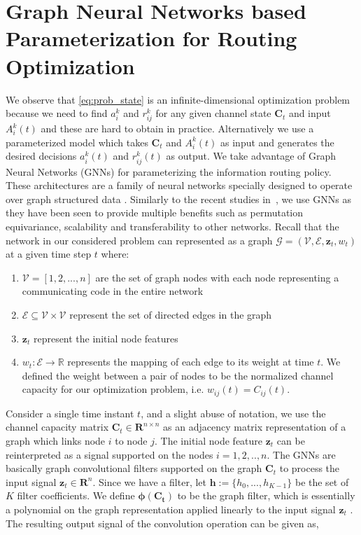 \documentclass[lettersize,journal]{IEEEtran}
\begin{document}
\section{Graph Neural Networks based Parameterization for Routing Optimization} \label{sec:gnn_par}
We observe that \eqref{eq:prob_state} is an infinite-dimensional optimization problem because we need to find $a_i^k$ and $r_{ij}^k$ for any given channel state $\mathbf{C}_t$ and input $A_i^k(t)$ and these are hard to obtain in practice. Alternatively we use a parameterized model which takes $\mathbf{C}_t$ and $A_i^k(t)$ as input and generates the desired decisions $a_i^k(t)$ and $r_{ij}^k(t)$ as output. We take advantage of Graph Neural Networks (GNNs) for parameterizing the information routing policy. These architectures are a family of neural networks specially designed to operate over graph structured data \cite{battaglia2018relational, wu2020comprehensive}. Similarly to the recent studies in~\cite{eisen2020optimal, naderializadeh2023learning, naderializadeh2022state, lee2020graph, shen2019graph}, we use GNNs as they have been seen to provide multiple benefits such as permutation equivariance, scalability and transferability to other networks. Recall that the network in our considered problem can represented as a graph $\mathcal{G} = (\mathcal{V}, \mathcal{E}, \mathbf{z}_t, w_t)$ at a given time step $t$ where: 
\begin{enumerate}
    \item $\mathcal{V}=[1,2,...,n]$ are the set of graph nodes with each node representing a communicating code in the entire network
    \item $\mathcal{E} \subseteq \mathcal{V} \times \mathcal{V}$ represent the set of directed edges in the graph
    \item $\mathbf{z}_t$ represent the initial node features%
    \item $w_t: \mathcal{E} \rightarrow \mathbb{R}$ represents the mapping of each edge to its weight at time $t$. We defined the weight between a pair of nodes to be the normalized channel capacity for our optimization problem, i.e. $w_{ij}(t) = C_{ij}(t)$.
\end{enumerate}
Consider a single time instant $t$, and a slight abuse of notation, we use the channel capacity matrix $\mathbf{C}_t \in \mathbf{R}^{n \times n}$ as an adjacency matrix representation of a graph which links node $i$ to node $j$. The initial node feature $\mathbf{z}_t$ can be reinterpreted as a signal supported on the nodes $i=1,2,..,n$. The GNNs are basically graph convolutional filters supported on the graph $\mathbf{C}_t$ to process the input signal $\mathbf{z}_t \in \mathbf{R}^n$. Since we have a filter, let $\mathbf{h} := \{h_0,...,h_{K-1}\}$ be the set of $K$ filter coefficients. We define $\mathbf{\phi(C_t)}$ to be the graph filter, which is essentially a polynomial on the graph representation applied linearly to the input signal $\mathbf{z}_t$ \cite{sandryhaila2014big}. The resulting output signal of the convolution operation can be given as,
\end{document}
